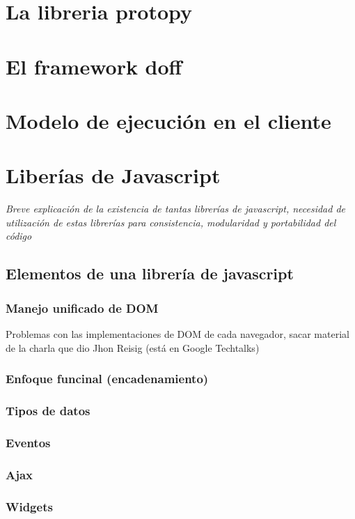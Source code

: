 \documentclass[a4paper]{report}
\begin{document}
\section{La libreria protopy}

\section{El framework doff}


\section{Modelo de ejecución en el cliente}
\section{Liberías de Javascript}
\emph{Breve explicación de la existencia de tantas librerías de javascript,
necesidad de utilización de estas librerías para consistencia, modularidad y
portabilidad del código}
\subsection{Elementos de una librería de javascript}


\subsubsection{Manejo unificado de DOM}
Problemas con las implementaciones de DOM de cada navegador, sacar material de
la charla que dio Jhon Reisig (está en Google Techtalks)


\subsubsection{Enfoque funcinal (encadenamiento) }
\subsubsection{Tipos de datos}
\subsubsection{Eventos}
\subsubsection{Ajax}
\subsubsection{Widgets}
\end{document}

